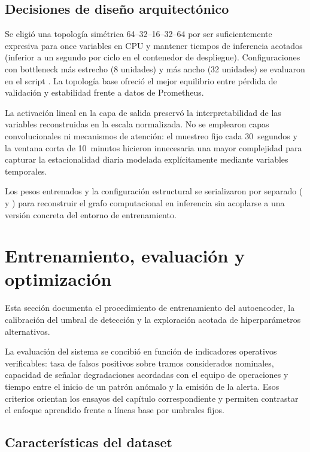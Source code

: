 \subsection{Decisiones de diseño arquitectónico}

Se eligió una topología simétrica 64--32--16--32--64 por ser suficientemente expresiva para once variables en CPU y mantener tiempos de inferencia acotados (inferior a un segundo por ciclo en el contenedor de despliegue). Configuraciones con bottleneck más estrecho (8 unidades) y más ancho (32 unidades) se evaluaron en el script . La topología base ofreció el mejor equilibrio entre pérdida de validación y estabilidad frente a datos de Prometheus.

La activación lineal en la capa de salida preservó la interpretabilidad de las variables reconstruidas en la escala normalizada. No se emplearon capas convolucionales ni mecanismos de atención: el muestreo fijo cada 30~segundos y la ventana corta de 10~minutos hicieron innecesaria una mayor complejidad para capturar la estacionalidad diaria modelada explícitamente mediante variables temporales.

Los pesos entrenados y la configuración estructural se serializaron por separado ( y ) para reconstruir el grafo computacional en inferencia sin acoplarse a una versión concreta del entorno de entrenamiento.

\section{Entrenamiento, evaluación y optimización}
\label{sec:entrenamiento}

Esta sección documenta el procedimiento de entrenamiento del autoencoder, la calibración del umbral de detección y la exploración acotada de hiperparámetros alternativos.

La evaluación del sistema se concibió en función de indicadores operativos verificables: tasa de falsos positivos sobre tramos considerados nominales, capacidad de señalar degradaciones acordadas con el equipo de operaciones y tiempo entre el inicio de un patrón anómalo y la emisión de la alerta. Esos criterios orientan los ensayos del capítulo correspondiente y permiten contrastar el enfoque aprendido frente a líneas base por umbrales fijos.

\subsection{Características del dataset}


